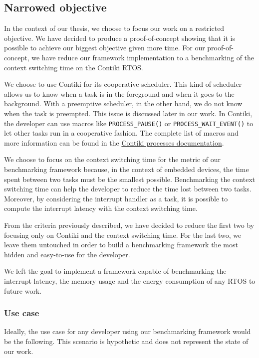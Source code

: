 \subsection{Narrowed objective}

In the context of our thesis, we choose to focus our work on a restricted objective.
We have decided to produce a proof-of-concept showing that it is possible to achieve our biggest objective given more time.
For our proof-of-concept, we have reduce our framework implementation to a benchmarking of the context switching time on the Contiki RTOS.

We choose to use Contiki for its cooperative scheduler.
This kind of scheduler allows us to know when a task is in the foreground and when it goes to the background.
With a preemptive scheduler, in the other hand, we do not know when the task is preempted.
This issue is discussed later in our work.
In Contiki, the developer can use macros like \texttt{PROCESS\_PAUSE()} or \texttt{PROCESS\_WAIT\_EVENT()} to let other tasks run in a cooperative fashion.
The complete list of macros and more information can be found in the \href{https://github.com/contiki-os/contiki/wiki/Processes}{Contiki processes documentation}.

We choose to focus on the context switching time for the metric of our benchmarking framework because, in the context of embedded devices, the time spent between two tasks must be the smallest possible.
Benchmarking the context switching time can help the developer to reduce the time lost between two tasks.
Moreover, by considering the interrupt handler as a task, it is possible to compute the interrupt latency with the context switching time.

From the criteria previously described, we have decided to reduce the first two by focusing only on Contiki and the context switching time.
For the last two, we leave them untouched in order to build a benchmarking framework the most hidden and easy-to-use for the developer.

We left the goal to implement a framework capable of benchmarking the interrupt latency, the memory usage and the energy consumption of any RTOS to future work.

\subsubsection{Use case}
Ideally, the use case for any developer using our benchmarking framework would be the following.
This scenario is hypothetic and does not represent the state of our work.

